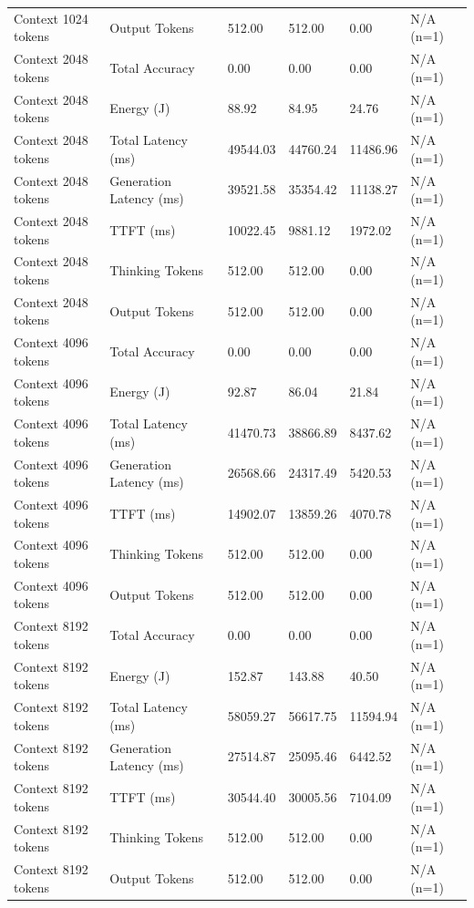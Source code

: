 \begin{table}
\begin{tabular}{llllll}
Context 1024 tokens & Output Tokens & 512.00 & 512.00 & 0.00 & N/A (n=1) \\
Context 2048 tokens & Total Accuracy & 0.00 & 0.00 & 0.00 & N/A (n=1) \\
Context 2048 tokens & Energy (J) & 88.92 & 84.95 & 24.76 & N/A (n=1) \\
Context 2048 tokens & Total Latency (ms) & 49544.03 & 44760.24 & 11486.96 & N/A (n=1) \\
Context 2048 tokens & Generation Latency (ms) & 39521.58 & 35354.42 & 11138.27 & N/A (n=1) \\
Context 2048 tokens & TTFT (ms) & 10022.45 & 9881.12 & 1972.02 & N/A (n=1) \\
Context 2048 tokens & Thinking Tokens & 512.00 & 512.00 & 0.00 & N/A (n=1) \\
Context 2048 tokens & Output Tokens & 512.00 & 512.00 & 0.00 & N/A (n=1) \\
Context 4096 tokens & Total Accuracy & 0.00 & 0.00 & 0.00 & N/A (n=1) \\
Context 4096 tokens & Energy (J) & 92.87 & 86.04 & 21.84 & N/A (n=1) \\
Context 4096 tokens & Total Latency (ms) & 41470.73 & 38866.89 & 8437.62 & N/A (n=1) \\
Context 4096 tokens & Generation Latency (ms) & 26568.66 & 24317.49 & 5420.53 & N/A (n=1) \\
Context 4096 tokens & TTFT (ms) & 14902.07 & 13859.26 & 4070.78 & N/A (n=1) \\
Context 4096 tokens & Thinking Tokens & 512.00 & 512.00 & 0.00 & N/A (n=1) \\
Context 4096 tokens & Output Tokens & 512.00 & 512.00 & 0.00 & N/A (n=1) \\
Context 8192 tokens & Total Accuracy & 0.00 & 0.00 & 0.00 & N/A (n=1) \\
Context 8192 tokens & Energy (J) & 152.87 & 143.88 & 40.50 & N/A (n=1) \\
Context 8192 tokens & Total Latency (ms) & 58059.27 & 56617.75 & 11594.94 & N/A (n=1) \\
Context 8192 tokens & Generation Latency (ms) & 27514.87 & 25095.46 & 6442.52 & N/A (n=1) \\
Context 8192 tokens & TTFT (ms) & 30544.40 & 30005.56 & 7104.09 & N/A (n=1) \\
Context 8192 tokens & Thinking Tokens & 512.00 & 512.00 & 0.00 & N/A (n=1) \\
Context 8192 tokens & Output Tokens & 512.00 & 512.00 & 0.00 & N/A (n=1) \\
\bottomrule
\end{tabular}
\end{table}
